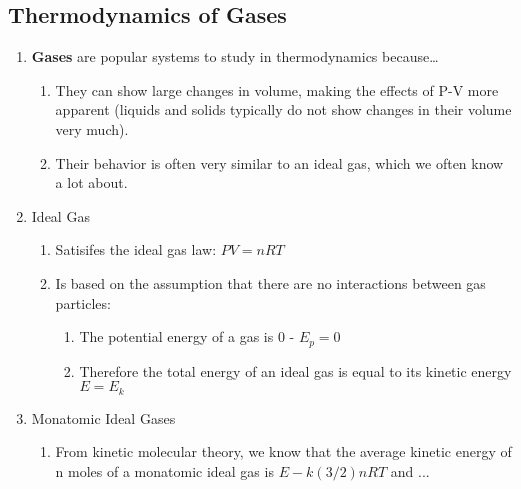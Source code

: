 \documentclass{article}  %
\begin{document}
\subsection*{Thermodynamics of Gases}
\begin{enumerate}
    \item \textbf{Gases} are popular systems to study in thermodynamics because\dots
        \begin{enumerate}
            \item They can show large changes in volume, making the effects of P-V more apparent (liquids and solids typically do not show changes in their volume very much).
            \item Their behavior is often very similar to an ideal gas, which we often know a lot about.
        \end{enumerate}
    \item Ideal Gas
        \begin{enumerate}
            \item Satisifes the ideal gas law: $PV=nRT$
            \item Is based on the assumption that there are no interactions between gas particles:
                \begin{enumerate}
                    \item The potential energy of a gas is 0 - $E_p = 0$
                    \item Therefore the total energy of an ideal gas is equal to its kinetic energy $E = E_k$
                \end{enumerate}
        \end{enumerate}
    \item Monatomic Ideal Gases
        \begin{enumerate}
            \item From kinetic molecular theory, we know that the average kinetic energy of n moles of a monatomic ideal gas is $E-k (3/2)nRT$ and ... %
        \end{enumerate}
\end{enumerate}
\end{document}
